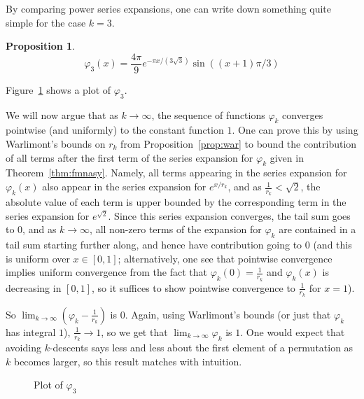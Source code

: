 \documentclass{amsart}
\newtheorem{proposition}[theorem]{Proposition}
\theoremstyle{definition}
\begin{document}
By comparing power series expansions, one can write down something quite simple for the case $k=3$.

\begin{proposition}
\[\varphi_3(x)=\frac{4\pi}{9}e^{-\pi x/ (3\sqrt{3})}\sin((x+1)\pi/3)\]
\end{proposition}
Figure~\ref{fig:plots} shows a plot of $\varphi_3$. 

We will now argue that as $k\to \infty$, the sequence of functions $\varphi_k$ converges pointwise (and uniformly) to the constant function $1$. One can prove this by using Warlimont's bounds on $r_k$ from Proposition~\ref{prop:war} to bound the contribution of all terms after the first term of the series expansion for $\varphi_k$ given in Theorem~\ref{thm:fmnasy}. Namely, all terms appearing in the series expansion for $\varphi_k(x)$ also appear in the series expansion for $e^{x/r_k}$, and as $\frac{1}{r_k}<\sqrt{2}$, the absolute value of each term is upper bounded by the corresponding term in the series expansion for $e^{\sqrt{2}}$. Since this series expansion converges, the tail sum goes to $0$, and as $k\to \infty$, all non-zero terms of the expansion for $\varphi_k$ are contained in a tail sum starting further along, and hence have contribution going to $0$ (and this is uniform over $x\in [0,1]$; alternatively, one see that pointwise convergence implies uniform convergence from the fact that $\varphi_k(0)=\frac{1}{r_k}$ and $\varphi_k(x)$ is decreasing in $[0,1]$, so it suffices to show pointwise convergence to $\frac{1}{r_k}$ for $x=1$).

So $\lim_{k\to \infty}\left(\varphi_k-\frac{1}{r_k}\right)$ is $0$. Again, using Warlimont's bounds (or just that $\varphi_k$ has integral $1$), $\frac{1}{r_k}\to 1$, so we get that $\lim_{k\to\infty}\varphi_k$ is $1$. One would expect that avoiding $k$-descents says less and less about the first element of a permutation as $k$ becomes larger, so this result matches with intuition.

\begin{figure}
    \centering

    \caption{Plot of $\varphi_3$}%
    \label{fig:plots}
\end{figure}
\end{document}

